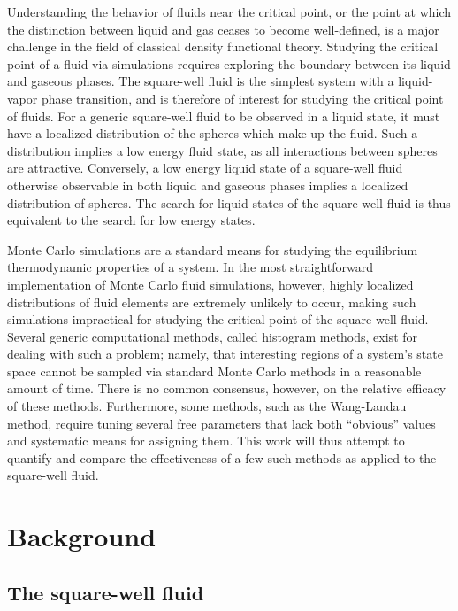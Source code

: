 \documentclass[11pt]{article}
\begin{document}
Understanding the behavior of fluids near the critical point, or the
point at which the distinction between liquid and gas ceases to become
well-defined, is a major challenge in the field of classical density
functional theory. Studying the critical point of a fluid via
simulations requires exploring the boundary between its liquid and
gaseous phases. The square-well fluid is the simplest system with a
liquid-vapor phase transition, and is therefore of interest for
studying the critical point of fluids. For a generic square-well fluid
to be observed in a liquid state, it must have a localized
distribution of the spheres which make up the fluid. Such a
distribution implies a low energy fluid state, as all interactions
between spheres are attractive. Conversely, a low energy liquid state
of a square-well fluid otherwise observable in both liquid and gaseous
phases implies a localized distribution of spheres. The search for
liquid states of the square-well fluid is thus equivalent to the
search for low energy states.

Monte Carlo simulations are a standard means for studying the
equilibrium thermodynamic properties of a system. In the most
straightforward implementation of Monte Carlo fluid simulations,
however, highly localized distributions of fluid elements are
extremely unlikely to occur, making such simulations impractical for
studying the critical point of the square-well fluid. Several generic
computational methods, called histogram methods, exist for dealing
with such a problem; namely, that interesting regions of a system's
state space cannot be sampled via standard Monte Carlo methods in a
reasonable amount of time. There is no common consensus, however, on
the relative efficacy of these methods. Furthermore, some methods,
such as the Wang-Landau method\cite{wang_landau}, require tuning
several free parameters that lack both ``obvious'' values and
systematic means for assigning them. This work will thus attempt to
quantify and compare the effectiveness of a few such methods as
applied to the square-well fluid.


\section{Background}
\label{sec:background}

\subsection{The square-well fluid}
\label{sec:sw_fluid}
\end{document}
